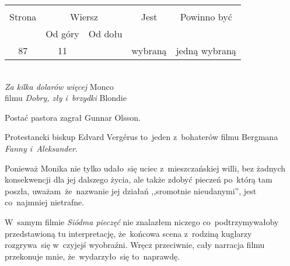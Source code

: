 \documentclass[a4paper,11pt]{article}
\begin{document}
\begin{center}
  \begin{tabular}{|c|c|c|c|c|}
    \hline
    & \multicolumn{2}{c|}{} & & \\
    Strona & \multicolumn{2}{c|}{Wiersz} & Jest
                              & Powinno być \\ \cline{2-3}
    & Od góry & Od dołu & & \\
    \hline
    87 & 11 & & wybraną & jedną wybraną \\
    \hline
  \end{tabular}
\end{center}
\noi
{} \\
\Jest \emph{Za kilka dolarów więcej} Monco \\
\Pow filmu \emph{Dobry, zły i~brzydki} Blondie \\

\vspace{\spaceTwo}








\start {} Postać pastora zagrał Gunnar Olsson.

\vspace{\spaceFour}


\start {} Protestancki biskup Edvard Verg\'{e}rus
to~jeden z~bohaterów filmu Bergmana \emph{Fanny i~Aleksander}.

\vspace{\spaceFour}


\start {} Ponieważ Monika nie tylko udało~się uciec
z~mieszczańskiej willi, bez żadnych konsekwencji dla jej dalszego
życia, ale także zdobyć pieczeń po~którą tam poszła,
uważam~że~nazwanie jej działań ,,sromotnie nieudanymi'', jest
co~najmniej nietrafne.

\vspace{\spaceFour}


\start {} W~samym filmie \emph{Siódma pieczęć} nie znalazłem
niczego co~podtrzymywałoby przedstawioną tu interpretację, że~końcowa
scena z~rodziną kuglarzy rozgrywa~się w~czyjejś wyobraźni. Wręcz
przeciwnie, cały narracja filmu przekonuje mnie, że~wydarzyło~się
to~naprawdę.
\end{document}
